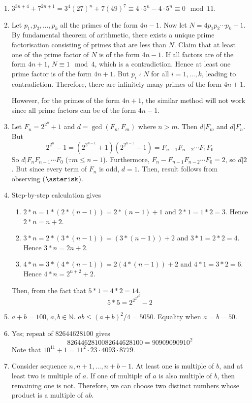\documentclass[10pt, a4paper, twoside]{report}
\begin{document}
\begin{enumerate}[{1.}]
    \item \(3^{3n+4}+7^{2n+1}=3^4(27)^n+7(49)^7\equiv 4\cdot 5^n-4\cdot 5^n\equiv 0\mod 11\).
    \item Let \(p_1,p_2,\ldots,p_k\) all the primes of the form \(4n-1\). Now let \(N=4p_1p_2\cdots p_k-1\). By fundamental theorem of arithmetic, there exists a unique prime factorisation consisting of primes that are less than \(N\). Claim that at least one of the prime factor of \(N\) is of the form \(4n-1\). If all factors are of the form \(4n+1\), \(N\equiv 1\mod 4\), which is a contradiction. Hence at least one prime factor is of the form \(4n+1\). But \(p_i\nmid N\) for all \(i=1,\ldots,k\), leading to contradiction. Therefore, there are infinitely many primes of the form \(4n+1\). 

    However, for the primes of the form \(4n+1\), the similar method will not work since all prime factors can be of the form \(4n-1\).
    \item Let \(F_n=2^{2^n}+1\) and \(d=\gcd(F_n,F_m)\) where \(n>m\). Then \(d|F_m\) and \(d|F_n\). But
    \[2^{2^n}-1=(2^{2^{n-1}}+1)(2^{2^{n-1}}-1)=F_{n-1}F_{n-2}\cdots F_1F_0\tag{\(\asterisk\)}\]
    So \(d|F_nF_{n-1}\cdots F_0\) (\(\because m\leq n-1\)). Furthermore, \(F_{n}-F_{n-1}F_{n-2}\cdots F_{0}=2\), so \(d|2\). But since every term of \(F_n\) is odd, \(d=1\). Then, result follows from observing (\(\asterisk\)).
    \item Step-by-step calculation gives
    \begin{enumerate}
        \item     \(2*n=1*(2*(n-1))=2*(n-1)+1\) and \(2*1=1*2=3\). Hence \(2*n=n+2\).
        \item \(3*n=2*(3*(n-1))=(3*(n-1))+2\) and \(3*1=2*2=4\). Hence \(3*n=2n+2\).
        \item \(4*n=3*(4*(n-1))=2(4*(n-1))+2\) and \(4*1=3*2=6\). Hence \(4*n=2^{n+2}+2\).
    \end{enumerate}
    Then, from the fact that \(5*1=4*2=14\),
    \[5*5=2^{2^{2^{2^{16}}}}-2\]
    \item \(a+b=100\), \(a,b\in\mathbb{N}\). \(ab\leq (a+b)^2/4=5050\). Equality when \(a=b=50\).
    \item Yes; repeat of \(82644628100\) gives 
    \[8264462810082644628100=90909090910^2\]
    Note that \(10^{11}+1=11^2\cdot 23\cdot 4093\cdot 8779\).
    \item Consider sequence \(n,n+1,\ldots,n+b-1\). At least one is multiple of \(b\), and at least two is multiple of \(a\). If one of multiple of \(a\) is also multiple of \(b\), then remaining one is not. Therefore, we can choose two distinct numbers whose product is a multiple of \(ab\).
\end{enumerate}
\end{document}
